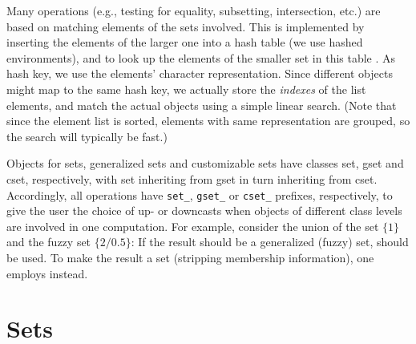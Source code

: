 \documentclass[article]{jss}
\newcommand{\class}[1]{\textsf{#1}}
\newcommand{\samp}[1]{\normalfont\texttt{#1}}
\newcommand{\codefun}[1]{\code{#1()}}
\begin{document}
Many operations (e.g., testing for equality, subsetting, intersection,
etc.) are based on matching elements of the sets involved.  This is
implemented by inserting the elements of the larger one into a hash
table (we use hashed environments), and to look up the elements of the
smaller set in this table \citep[p.~391]{sets:knuth:1973}.  As hash key,
we use the elements' character representation. Since different objects
might map to the same hash key, we actually store the \emph{indexes} of
the list elements, and match the actual objects using a simple linear
search. (Note that since the element list is sorted, elements with same
representation are grouped, so the search will typically be fast.)

Objects for sets, generalized sets and customizable sets have 
classes \class{set}, \class{gset} and \class{cset}, respectively, with
\class{set} inheriting from \class{gset} in turn inheriting from
\class{cset}. Accordingly, all operations have \samp{set\_},
\samp{gset\_} or \samp{cset\_} prefixes, respectively, to give the user
the choice of up- or downcasts when objects of different class levels
are involved in one computation. For example, consider the union of the
set $\{1\}$ and the fuzzy set $\{2/0.5\}$: If the result should be a
generalized (fuzzy) set, \codefun{gset\_union} should be used.  To make
the result a set (stripping membership information), one employs
\codefun{set\_union} instead.

\section{Sets}
\label{sec:sets}
\end{document}

